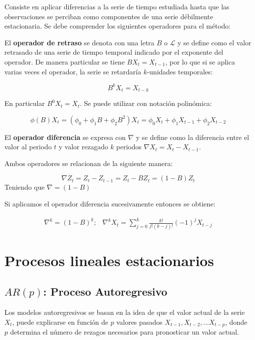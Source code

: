 \documentclass[
  a4paper,
  oneside,
  openany]{book}
\begin{document}
Consiste en aplicar diferencias a la serie de tiempo estudiada hasta que las observaciones se perciban como componentes de una serie débilmente estacionaria. Se debe comprender los siguientes operadores para el método:

El \textbf{operador de retraso} se denota con una letra \(B\) o \(\mathcal{L}\) y se define como el valor retrasado de una serie de tiempo temporal indicado por el exponente del operador. De manera particular se tiene \(BX_t = X_{t-1}\), por lo que si se aplica varias veces el operador, la serie se retardaría \(k\)-unidades temporales:

\[
B^kX_t=X_{t-k}
\]

En particular \(B^0X_t=X_t\). Se puede utilizar con notación polinómica:

\[
\phi(B)X_t = \left(\phi_0+\phi_1B+\phi_2B^2\right)X_t = \phi_0X_t+\phi_1X_{t-1}+\phi_2X_{t-2} 
\]

El \textbf{operador diferencia} se expresa con \(\nabla\) y se define como la diferencia entre el valor al periodo \(t\) y valor rezagado \(k\) periodos \(\nabla X_t=X_t-X_{t-1}\).

Ambos operadores se relacionan de la siguiente manera:

\[
\nabla Z_t=Z_t-Z_{t-1}=Z_t-BZ_t=(1-B)Z_t
\]
Teniendo que \(\nabla=(1-B)\)

Si aplicamos el operador diferencia sucesivamente entonces se obtiene:

\[
\begin{array}{cc}
\nabla^k=(1-B)^k; & \nabla^kX_t=\sum_{j=0}^k\frac{k!}{j!(k-j)!}(-1)^jX_{t-j}
\end{array}
\]

\hypertarget{part-procesos-lineales-estacionarios}{%
\part{Procesos lineales estacionarios}\label{part-procesos-lineales-estacionarios}}

\hypertarget{arp-proceso-autoregresivo}{%
\chapter{\texorpdfstring{\(AR(p)\): Proceso Autoregresivo}{AR(p): Proceso Autoregresivo}}\label{arp-proceso-autoregresivo}}

Los modelos autoregresivos se basan en la idea de que el valor actual de la serie \(X_t\), puede explicarse en función de \(p\) valores pasados \(X_{t-1},X_{t-2},...X_{t-p}\), donde \(p\) determina el número de rezagos necesarios para pronosticar un valor actual.
\end{document}
